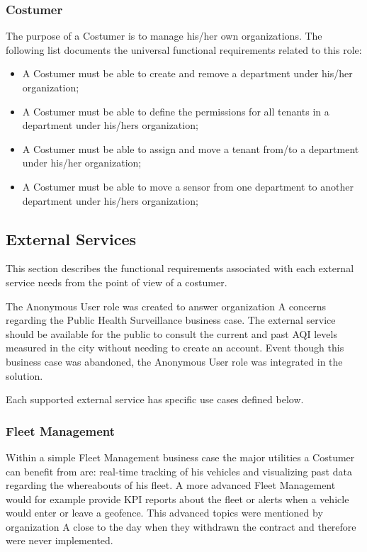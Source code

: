 \subsubsection{Costumer}
\label{subsubsec:requirements:functional:sensae:costumer}

The purpose of a Costumer is to manage his/her own organizations.
The following list documents the universal functional requirements related to this role:

\begin{itemize}
    \item A Costumer must be able to create and remove a department under his/her organization;
    \item A Costumer must be able to define the permissions for all tenants in a department under his/hers organization;
    \item A Costumer must be able to assign and move a tenant from/to a department under his/her organization;
    \item A Costumer must be able to move a sensor from one department to another department under his/hers organization;
\end{itemize}

\subsection{External Services}
\label{subsec:requirements:functional:services}

This section describes the functional requirements associated with each external service needs from the point of view of a costumer.

The Anonymous User role was created to answer organization A concerns regarding the Public Health Surveillance business case. The external service should be available for the public to consult the current and past \gls{AQI} levels measured in the city without needing to create an account. Event though this business case was abandoned, the Anonymous User role was integrated in the solution.

Each supported external service has specific use cases defined below.

\subsubsection{Fleet Management}
\label{subsubsec:requirements:functional:services:fleet}

Within a simple Fleet Management business case the major utilities a Costumer can benefit from are: real-time tracking of his vehicles and visualizing past data regarding the whereabouts of his fleet. A more advanced Fleet Management would for example provide \gls{KPI} reports about the fleet or alerts when a vehicle would enter or leave a geofence. This advanced topics were mentioned by organization A close to the day when they withdrawn the contract and therefore were never implemented.

